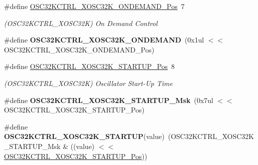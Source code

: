 \begin{DoxyCompactItemize}
\item 
\hypertarget{group___s_a_m_l21___o_s_c32_k_c_t_r_l_ga3f72f0a3fe37daf64ad90aa1041cc747}{}\#define \hyperlink{group___s_a_m_l21___o_s_c32_k_c_t_r_l_ga3f72f0a3fe37daf64ad90aa1041cc747}{O\+S\+C32\+K\+C\+T\+R\+L\+\_\+\+X\+O\+S\+C32\+K\+\_\+\+O\+N\+D\+E\+M\+A\+N\+D\+\_\+\+Pos}~7\label{group___s_a_m_l21___o_s_c32_k_c_t_r_l_ga3f72f0a3fe37daf64ad90aa1041cc747}

\begin{DoxyCompactList}\small\item\em (O\+S\+C32\+K\+C\+T\+R\+L\+\_\+\+X\+O\+S\+C32\+K) On Demand Control \end{DoxyCompactList}\item 
\hypertarget{group___s_a_m_l21___o_s_c32_k_c_t_r_l_ga85cbdca51f42273bf6312a20699e2ebd}{}\#define {\bfseries O\+S\+C32\+K\+C\+T\+R\+L\+\_\+\+X\+O\+S\+C32\+K\+\_\+\+O\+N\+D\+E\+M\+A\+N\+D}~(0x1ul $<$$<$ O\+S\+C32\+K\+C\+T\+R\+L\+\_\+\+X\+O\+S\+C32\+K\+\_\+\+O\+N\+D\+E\+M\+A\+N\+D\+\_\+\+Pos)\label{group___s_a_m_l21___o_s_c32_k_c_t_r_l_ga85cbdca51f42273bf6312a20699e2ebd}

\item 
\hypertarget{group___s_a_m_l21___o_s_c32_k_c_t_r_l_gace3a98c58164bac82b192e5c04bbc4f8}{}\#define \hyperlink{group___s_a_m_l21___o_s_c32_k_c_t_r_l_gace3a98c58164bac82b192e5c04bbc4f8}{O\+S\+C32\+K\+C\+T\+R\+L\+\_\+\+X\+O\+S\+C32\+K\+\_\+\+S\+T\+A\+R\+T\+U\+P\+\_\+\+Pos}~8\label{group___s_a_m_l21___o_s_c32_k_c_t_r_l_gace3a98c58164bac82b192e5c04bbc4f8}

\begin{DoxyCompactList}\small\item\em (O\+S\+C32\+K\+C\+T\+R\+L\+\_\+\+X\+O\+S\+C32\+K) Oscillator Start-\/\+Up Time \end{DoxyCompactList}\item 
\hypertarget{group___s_a_m_l21___o_s_c32_k_c_t_r_l_ga135006047a837d0c00f6eeb490d67989}{}\#define {\bfseries O\+S\+C32\+K\+C\+T\+R\+L\+\_\+\+X\+O\+S\+C32\+K\+\_\+\+S\+T\+A\+R\+T\+U\+P\+\_\+\+Msk}~(0x7ul $<$$<$ O\+S\+C32\+K\+C\+T\+R\+L\+\_\+\+X\+O\+S\+C32\+K\+\_\+\+S\+T\+A\+R\+T\+U\+P\+\_\+\+Pos)\label{group___s_a_m_l21___o_s_c32_k_c_t_r_l_ga135006047a837d0c00f6eeb490d67989}

\item 
\hypertarget{group___s_a_m_l21___o_s_c32_k_c_t_r_l_ga5c7441085cbe7e77a0a117eb7080e9aa}{}\#define {\bfseries O\+S\+C32\+K\+C\+T\+R\+L\+\_\+\+X\+O\+S\+C32\+K\+\_\+\+S\+T\+A\+R\+T\+U\+P}(value)~(O\+S\+C32\+K\+C\+T\+R\+L\+\_\+\+X\+O\+S\+C32\+K\+\_\+\+S\+T\+A\+R\+T\+U\+P\+\_\+\+Msk \& ((value) $<$$<$ \hyperlink{group___s_a_m_l21___o_s_c32_k_c_t_r_l_gace3a98c58164bac82b192e5c04bbc4f8}{O\+S\+C32\+K\+C\+T\+R\+L\+\_\+\+X\+O\+S\+C32\+K\+\_\+\+S\+T\+A\+R\+T\+U\+P\+\_\+\+Pos}))\label{group___s_a_m_l21___o_s_c32_k_c_t_r_l_ga5c7441085cbe7e77a0a117eb7080e9aa}


\end{DoxyCompactItemize}
